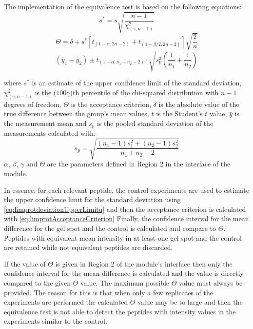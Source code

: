 The implementation of the equivalence test is based on the following equations:
\begin{equation}
	\label{eq:limprotdeviationUpperLimit}
	s^* = s\sqrt{\frac{n-1}{\chi^2_{(\gamma, n-1)}}}
\end{equation}
\begin{equation}
\label{eq:limprotAcceptanceCriterion}
\Theta = \delta + s^*\left[t_{(1-\alpha, 2n-2)} + t_{(1-\beta/2, 2n-2)}\right]\sqrt{\frac{2}{n}}
\end{equation}
\begin{equation}
\label{eq:limprot}
(\bar{y}_1 - \bar{y}_2) \pm t_{(1-\alpha, n_1+n_2-2)} \cdot \sqrt{s^2_p\left(\frac{1}{n_1}+\frac{1}{n_2}\right)}
\end{equation}

where $s^*$ is an estimate of the upper confidence limit of the standard deviation, $\chi^2_{(\gamma, n-1)}$ is the ($100\gamma$)th percentile of the chi-squared distribution with $n-1$ degrees of freedom, $\Theta$ is the acceptance criterion, $\delta$ is the absolute value of the true difference between the group's mean values, $t$ is the Student's $t$ value, $\bar{y}$ is the measurement mean and $s_p$ is the pooled standard deviation of the measurements calculated with:
\begin{equation}
s_p =  \sqrt{\frac{(n_1-1)s^2_1+(n_2-1)s^2_2}{n_1+n_2-2}}
\end{equation}
$\alpha$, $\beta$, $\gamma$ and $\Theta$ are the parameters defined in Region \num{2} in the interface of the module.

In essence, for each relevant peptide, the control experiments are used to estimate the upper confidence limit for the standard deviation using \autoref{eq:limprotdeviationUpperLimitq} and then the acceptance criterion is calculated with \autoref{eq:limprotAcceptanceCriterion} Finally, the confidence interval for the mean difference for the gel spot and the control is calculated and compare to $\Theta$. Peptides with equivalent mean intensity in at least one gel spot and the control are retained while not equivalent peptides are discarded. 

If the value of $\Theta$ is given in Region \num{2} of the module's interface then only the confidence interval for the mean difference is calculated and the value is directly compared to the given $\Theta$ value. The maximum possible $\Theta$ value must always be provided. The reason for this is that when only a few replicates of the experiments are performed the calculated $\Theta$ value may be to large and then the equivalence test is not able to detect the peptides with intensity values in the experiments similar to the control.


